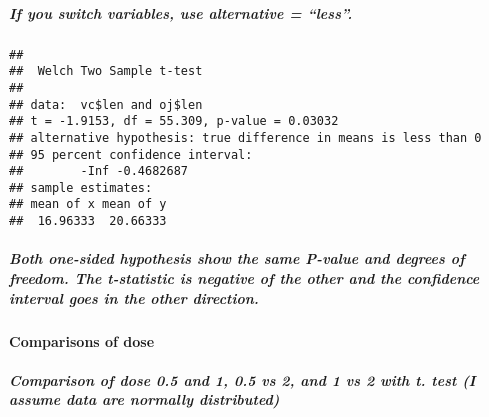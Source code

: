 \documentclass[
]{article}
\newenvironment{Shaded}{\begin{snugshade}}{\end{snugshade}}
\newcommand{\AttributeTok}[1]{\textcolor[rgb]{0.77,0.63,0.00}{#1}}
\newcommand{\ConstantTok}[1]{\textcolor[rgb]{0.00,0.00,0.00}{#1}}
\newcommand{\DecValTok}[1]{\textcolor[rgb]{0.00,0.00,0.81}{#1}}
\newcommand{\FloatTok}[1]{\textcolor[rgb]{0.00,0.00,0.81}{#1}}
\newcommand{\FunctionTok}[1]{\textcolor[rgb]{0.00,0.00,0.00}{#1}}
\newcommand{\NormalTok}[1]{#1}
\newcommand{\OtherTok}[1]{\textcolor[rgb]{0.56,0.35,0.01}{#1}}
\newcommand{\SpecialCharTok}[1]{\textcolor[rgb]{0.00,0.00,0.00}{#1}}
\newcommand{\StringTok}[1]{\textcolor[rgb]{0.31,0.60,0.02}{#1}}
\begin{document}
\hypertarget{if-you-switch-variables-use-alternative-less.}{%
\subparagraph{If you switch variables, use alternative =
``less''.}\label{if-you-switch-variables-use-alternative-less.}}

\begin{Shaded}
\end{Shaded}

\begin{verbatim}
## 
##  Welch Two Sample t-test
## 
## data:  vc$len and oj$len
## t = -1.9153, df = 55.309, p-value = 0.03032
## alternative hypothesis: true difference in means is less than 0
## 95 percent confidence interval:
##        -Inf -0.4682687
## sample estimates:
## mean of x mean of y 
##  16.96333  20.66333
\end{verbatim}

\hypertarget{both-one-sided-hypothesis-show-the-same-p-value-and-degrees-of-freedom.-the-t-statistic-is-negative-of-the-other-and-the-confidence-interval-goes-in-the-other-direction.}{%
\subparagraph{Both one-sided hypothesis show the same P-value and
degrees of freedom. The t-statistic is negative of the other and the
confidence interval goes in the other
direction.}\label{both-one-sided-hypothesis-show-the-same-p-value-and-degrees-of-freedom.-the-t-statistic-is-negative-of-the-other-and-the-confidence-interval-goes-in-the-other-direction.}}

\hypertarget{comparisons-of-dose}{%
\paragraph{Comparisons of dose}\label{comparisons-of-dose}}

\hypertarget{comparison-of-dose-0.5-and-1-0.5-vs-2-and-1-vs-2-with-t.-test-i-assume-data-are-normally-distributed}{%
\subparagraph{Comparison of dose 0.5 and 1, 0.5 vs 2, and 1 vs 2 with t.
test (I assume data are normally
distributed)}\label{comparison-of-dose-0.5-and-1-0.5-vs-2-and-1-vs-2-with-t.-test-i-assume-data-are-normally-distributed}}

\begin{Shaded}
\end{Shaded}
\end{document}
